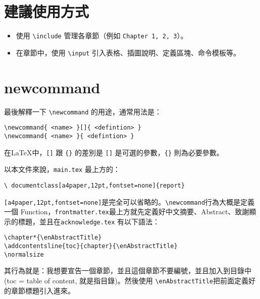 \section{建議使用方式}

\begin{itemize}
  \item 使用 \texttt{\textbackslash include} 管理各章節（例如 \texttt{Chapter 1, 2, 3}）。
  \item 在章節中，使用 \texttt{\textbackslash input} 引入表格、插圖說明、定義區塊、命令模板等。
\end{itemize}

\section{newcommand}

最後解釋一下 \texttt{\textbackslash newcommand} 的用途，通常用法是：

\begin{verbatim}
\newcommand{ <name> }[]{ <defintion> }
\newcommand{ <name> }{ <defintion> }
\end{verbatim}

在\LaTeX 中，\texttt{[]} 跟 \texttt{\{\}} 的差別是 \texttt{[]} 是可選的參數，\texttt{\{\}} 則為必要參數。

以本文件來說，\texttt{main.tex} 最上方的：


\begin{verbatim}
\ documentclass[a4paper,12pt,fontset=none]{report}
\end{verbatim}

\texttt{[a4paper,12pt,fontset=none]}是完全可以省略的。\texttt{\textbackslash newcommand}行為大概是定義一個 Function，\texttt{frontmatter.tex}最上方就先定義好中文摘要、Abstract、致謝顯示的標題，並且在\texttt{acknowledge.tex} 有以下語法：

\begin{verbatim}
\chapter*{\enAbstractTitle}
\addcontentsline{toc}{chapter}{\enAbstractTitle}
\normalsize
\end{verbatim}

其行為就是：我想要宣告一個章節，並且這個章節不要編號，並且加入到目錄中(toc = table of content, 就是指目錄)。然後使用 \texttt{\textbackslash enAbstractTitle}把前面定義好的章節標題引入進來。